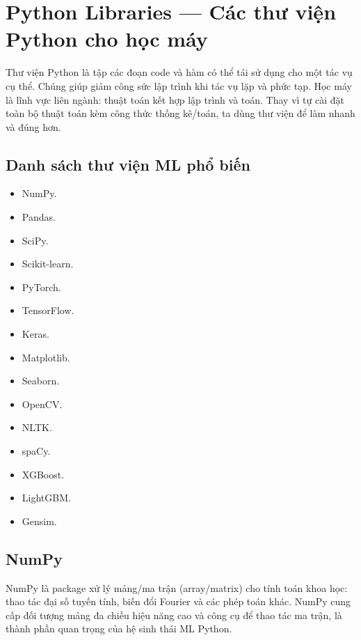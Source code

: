 \section{Python Libraries --- Các thư viện Python cho học máy}

\begin{dongco}[title={Vì sao dùng thư viện?}]
Thư viện Python là tập các đoạn code và hàm có thể tái sử dụng cho một tác vụ cụ thể.
Chúng giúp giảm công sức lập trình khi tác vụ lặp và phức tạp.
Học máy là lĩnh vực liên ngành: thuật toán kết hợp lập trình và toán.
Thay vì tự cài đặt toàn bộ thuật toán kèm công thức thống kê/toán, ta dùng thư viện để làm nhanh và đúng hơn.
\end{dongco}

\subsection{Danh sách thư viện ML phổ biến}

\begin{phuongphap}[title={Các thư viện được liệt kê}]
\begin{itemize}
  \item NumPy.
  \item Pandas.
  \item SciPy.
  \item Scikit-learn.
  \item PyTorch.
  \item TensorFlow.
  \item Keras.
  \item Matplotlib.
  \item Seaborn.
  \item OpenCV.
  \item NLTK.
  \item spaCy.
  \item XGBoost.
  \item LightGBM.
  \item Gensim.
\end{itemize}
\end{phuongphap}

\subsection{NumPy}

\begin{dinhnghia}[title={NumPy}]
NumPy là package xử lý mảng/ma trận (array/matrix) cho tính toán khoa học:
thao tác đại số tuyến tính, biến đổi Fourier và các phép toán khác.
NumPy cung cấp đối tượng mảng đa chiều hiệu năng cao và công cụ để thao tác ma trận, là thành phần quan trọng của hệ sinh thái ML Python.
\end{dinhnghia}


